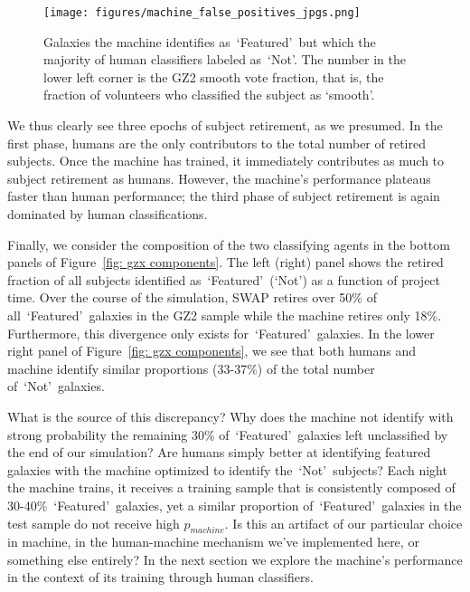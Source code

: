 \documentclass[twocolumn]{aastex6}
\newcommand{\feat}{`Featured'}
\newcommand{\notfeat}{`Not'}
\begin{document}
\begin{figure}[t!]
\centering
\texttt{[image: figures/machine\_false\_positives\_jpgs.png]}
\caption{Galaxies the machine identifies as~\feat~but which the majority of human classifiers labeled as~\notfeat. The number in the lower left corner is the GZ2 smooth vote fraction, that is, the fraction of volunteers who classified the subject as `smooth'. \label{fig: machine false pos}}
\end{figure}

We thus clearly see three epochs of subject retirement, as we presumed.
In the first phase, humans are the only contributors to the total number of retired subjects.  
Once the machine has trained, it immediately contributes as much to subject retirement as humans.
However, the machine's performance plateaus faster than human performance;  the third 
phase of subject retirement is again dominated by human classifications.

Finally, we consider the composition of the two classifying agents in the bottom 
panels of Figure~\ref{fig: gzx components}. The left (right) panel shows the 
retired fraction of all subjects identified as~\feat~(\notfeat) as a function of project time. 
Over the course of the simulation, SWAP retires over 50\% of all~\feat~galaxies 
in the GZ2 sample while the machine retires only 18\%. Furthermore, this divergence 
only exists for~\feat~galaxies. In the lower right panel of  Figure~\ref{fig: gzx components}, 
we see that both humans and machine identify similar proportions (33-37\%) of 
the total number of~\notfeat~galaxies. 

What is the source of this discrepancy? 
Why does the machine not identify with strong probability the remaining 30\% 
of~\feat~galaxies left unclassified by the end of our simulation? 
Are humans simply better at identifying featured galaxies with the machine optimized
to identify the~\notfeat~subjects? 
Each night the machine trains, it receives a training sample that is consistently composed of 30-40\%~\feat~galaxies, yet a similar proportion of~\feat~galaxies in the test sample
do not receive high $p_{machine}$.
Is this an artifact of our particular choice in machine, in the human-machine mechanism we've implemented here, or something else entirely?
In the next section we explore the machine's performance in the context of its 
training through human classifiers. 
\end{document}
